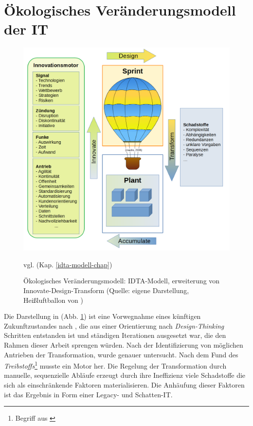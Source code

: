 \section{Ökologisches Veränderungsmodell der IT}
\begin{figure}[htbp]
 \centering
 \includegraphics[width=1.0\textwidth]{gfx/digital-transformation-lifecycle-by-selim4.PNG}
 \caption{Ökologisches Veränderungsmodell: IDTA-Modell, erweiterung von Innovate-Design-Transform\cite{Koch2016} (Quelle: eigene Darstellung, Heißluftballon von \citet{maidis_2006})\label{fig:digit-trans-idt}
 } vgl. (Kap. \ref{idta-modell-chap})
 \end{figure}

Die Darstellung in (Abb. \ref{fig:digit-trans-idt}) ist eine Vorwegnahme eines künftigen Zukunftzustandes nach \cite{Alt2017}, die aus einer Orientierung nach \emph{Design-Thinking} Schritten entstanden ist und ständigen Iterationen ausgesetzt war, die den Rahmen dieser Arbeit sprengen würden. Nach der Identifizierung von möglichen Antrieben der Transformation, wurde \cite{Ganswindt2006} genauer untersucht. Nach dem Fund des \emph{Treibstoffs}\footnote{Begriff aus \cite{Ganswindt2006}}  musste ein Motor her. Die Regelung der Transformation durch manuelle, sequenzielle Abläufe erzeugt durch ihre Ineffizienz viele Schadstoffe die sich als einschränkende Faktoren materialisieren. Die Anhäufung dieser Faktoren ist das Ergebnis in Form einer Legacy- und Schatten-IT.

